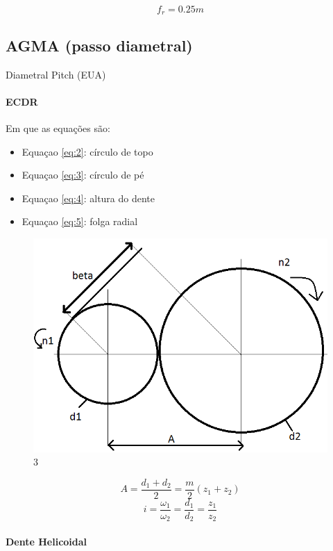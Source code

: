 \documentclass[a4paper, 12pt]{article}
\begin{document}
\begin{equation}
f_{r}=0.25m
\label{eq:5}
\end{equation}

\subsection{AGMA (passo diametral)}
Diametral Pitch (EUA)

\paragraph{ECDR}


Em que as equações são:
\begin{itemize}
\item Equaçao \ref{eq:2}: círculo de topo
\item Equaçao \ref{eq:3}: círculo de pé
\item Equaçao \ref{eq:4}: altura do dente
\item Equaçao \ref{eq:5}: folga radial
\end{itemize}

\begin{figure}[h]
\begin{center}
\includegraphics[scale=0.38]{./fig/3.png}
\caption{\label{fig:3}3} 
\end{center}
\end{figure}

\[A = \frac{d_{1}+d_{2}}{2}=\frac{m}{2}(z_{1}+z_{2})\]
\[i = \frac{\omega _{1}}{\omega _{2}} = \frac{d _{1}}{d_{2}}=\frac{z_{1}}{z_{2}}\]

\paragraph{Dente Helicoidal}
\end{document}
